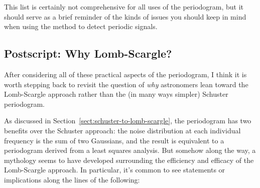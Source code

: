 \documentclass[preprint]{aastex}
\newcommand{\Sect}[1]{Section~\ref{sect:#1}}
\newcommand{\sect}[1]{\Sect{#1}}
\newcommand{\sectlabel}[1]{\label{sect:#1}}
\begin{document}
This list is certainly not comprehensive for all uses of the periodogram, but
it should serve as a brief reminder of the kinds of issues you should keep
in mind when using the method to detect periodic signals.


\subsection{Postscript: Why Lomb-Scargle?}
\sectlabel{postscript}
After considering all of these practical aspects of the periodogram,
I think it is worth stepping back to
revisit the question of {\it why} astronomers lean toward the
Lomb-Scargle approach rather than the (in many ways simpler) Schuster
periodogram.

As discussed in \sect{schuster-to-lomb-scargle}, the periodogram has two
benefits over the Schuster approach:
the noise distribution at each individual frequency is the sum
of two Gaussians, and the result is equivalent to a periodogram derived
from a least squares analysis.
But somehow along the way, a mythology seems to have developed surrounding
the efficiency and efficacy of the Lomb-Scargle approach. In particular,
it's common to see statements or implications along the lines of the following:
\end{document}

